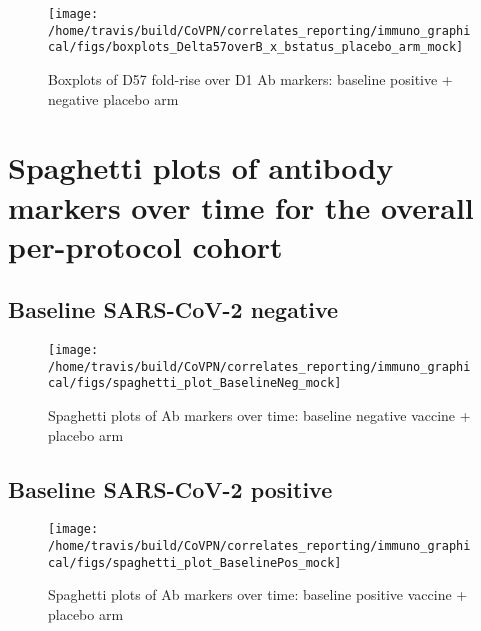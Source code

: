 \documentclass[]{book}
\theoremstyle{definition}
\theoremstyle{definition}
\theoremstyle{definition}
\newcommand{\1}{\mathbbm{1}}
\begin{document}
\clearpage
\begin{figure}[H]

{\centering \texttt{[image: /home/travis/build/CoVPN/correlates\_reporting/immuno\_graphical/figs/boxplots\_Delta57overB\_x\_bstatus\_placebo\_arm\_mock]} 

}

\caption{Boxplots of D57 fold-rise over D1 Ab markers: baseline positive + negative placebo arm}\label{fig:unnamed-chunk-52}
\end{figure}

\clearpage

\hypertarget{spaghetti-plots-of-antibody-markers-over-time-for-the-overall-per-protocol-cohort}{%
\section{Spaghetti plots of antibody markers over time for the overall per-protocol cohort}\label{spaghetti-plots-of-antibody-markers-over-time-for-the-overall-per-protocol-cohort}}

\hypertarget{baseline-sars-cov-2-negative-3}{%
\subsection{Baseline SARS-CoV-2 negative}\label{baseline-sars-cov-2-negative-3}}

\begin{figure}[H]

{\centering \texttt{[image: /home/travis/build/CoVPN/correlates\_reporting/immuno\_graphical/figs/spaghetti\_plot\_BaselineNeg\_mock]} 

}

\caption{Spaghetti plots of Ab markers over time: baseline negative vaccine + placebo arm}\label{fig:unnamed-chunk-53}
\end{figure}

\clearpage

\hypertarget{baseline-sars-cov-2-positive-3}{%
\subsection{Baseline SARS-CoV-2 positive}\label{baseline-sars-cov-2-positive-3}}

\begin{figure}[H]

{\centering \texttt{[image: /home/travis/build/CoVPN/correlates\_reporting/immuno\_graphical/figs/spaghetti\_plot\_BaselinePos\_mock]} 

}

\caption{Spaghetti plots of Ab markers over time: baseline positive vaccine + placebo arm}\label{fig:unnamed-chunk-54}
\end{figure}
\end{document}
